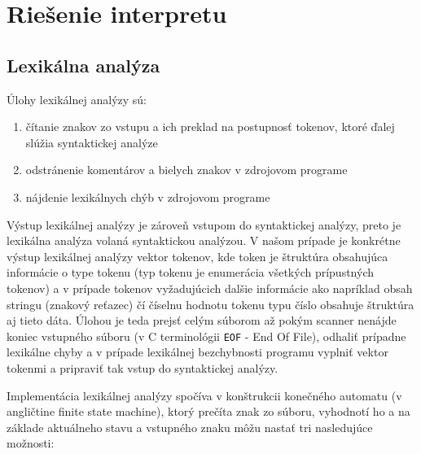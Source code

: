 \documentclass[12pt,a4paper,titlepage,final]{article}
\begin{document}
\pagestyle{plain}
\tableofcontents

\newpage
\pagestyle{plain}
\setcounter{page}{1}


\section{Riešenie interpretu} \label{Riesenie interpretu}

\subsection{Lexikálna analýza}
Úlohy lexikálnej analýzy sú:
\begin{enumerate}
    \itemsep0em
    \item čítanie znakov zo vstupu a ich preklad na postupnosť tokenov, ktoré ďalej slúžia syntaktickej analýze
    \item odstránenie komentárov a bielych znakov v zdrojovom programe
    \item nájdenie lexikálnych chýb v zdrojovom programe
\end{enumerate}

Výstup lexikálnej analýzy je zároveň vstupom do syntaktickej analýzy, preto je
lexikálna analýza volaná syntaktickou analýzou. V našom prípade je konkrétne
výstup lexikálnej analýzy vektor tokenov, kde token je štruktúra obsahujúca
informácie o type tokenu (typ tokenu je enumerácia všetkých prípustných tokenov)
a v prípade tokenov vyžadujúcich dalšie informácie ako napríklad obsah stringu
(znakový reťazec) čí číselnu hodnotu tokenu typu číslo obsahuje štruktúra aj tieto dáta.
Úlohou je teda prejsť celým súborom až pokým scanner nenájde koniec vstupného súboru
(v C terminológii \texttt{EOF} - End Of File), odhaliť prípadne lexikálne chyby a
v prípade lexikálnej bezchybnosti programu vyplniť vektor tokenmi a pripraviť
tak vstup do syntaktickej analýzy.

Implementácia lexikálnej analýzy spočíva v konštrukcii konečného automatu
(v angličtine finite state machine), ktorý prečíta znak zo súboru, vyhodnotí
ho a na základe aktuálneho stavu a vstupného znaku môžu nastať tri nasledujúce
 možnosti:
\end{document}
